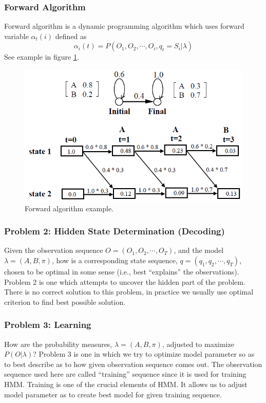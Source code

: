 \documentclass[12pt, a4paper, twoside]{report}
\begin{document}
\subsubsection{Forward Algorithm}
Forward algorithm is a dynamic programming algorithm which uses forward variable $\alpha_t(i)$ defined as
\begin{equation}
\alpha_i(t) = P(O_1,O_2, \cdots,O_i, q_t = S_i|\lambda)
\end{equation}
See example in figure \ref{fig:forward-eg}.
\begin{figure}[!h]
	\centering
	\includegraphics[width=1\textwidth]
	{images/chapter4/forward-eg}
	\caption{Forward algorithm example.}
	\label{fig:forward-eg}
\end{figure}

\subsubsection{Problem 2: Hidden State Determination (Decoding)}
Given the observation sequence $O = (O_1, O_2, \cdots,O_T)$, and the model $\lambda = (A,B, \pi)$, how is a corresponding state sequence, $q = (q_1, q_2, \cdots , q_T )$, chosen to be optimal in some sense (i.e., best ``explains'' the observations). Problem 2 is one which attempts to uncover the hidden part of the problem. There is no correct solution to this problem, in practice we usually use optimal criterion to find best possible solution.
\subsubsection{Problem 3: Learning}
How are the probability measures, $\lambda = (A,B, \pi)$, adjusted to maximize $P (O|\lambda)$? Problem 3 is one in which we try to optimize model parameter so as to best describe as to how given observation sequence comes out. The observation sequence used here are called ``training'' sequence since it is used for training HMM. Training is one of the crucial elements of HMM. It allows us to adjust model parameter as to create best model for given training sequence.
\end{document}

